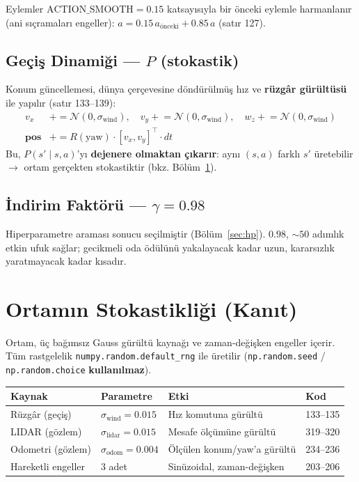 \documentclass[11pt,a4paper]{article}
\begin{document}
Eylemler $\text{ACTION\_SMOOTH}=0.15$ katsayısıyla bir önceki eylemle harmanlanır
(ani sıçramaları engeller): $a = 0.15\,a_{\text{önceki}} + 0.85\,a$ (satır 127).

\subsection{Geçiş Dinamiği --- $P$ (stokastik)}
Konum güncellemesi, dünya çerçevesine döndürülmüş hız ve \textbf{rüzgâr
gürültüsü} ile yapılır (satır 133--139):
\begin{align*}
v_x &\mathrel{+}= \mathcal{N}(0, \sigma_{\text{wind}}), \quad
v_y \mathrel{+}= \mathcal{N}(0, \sigma_{\text{wind}}), \quad
w_z \mathrel{+}= \mathcal{N}(0, \sigma_{\text{wind}}) \\
\mathbf{pos} &\mathrel{+}= R(\text{yaw}) \cdot [v_x, v_y]^\top \cdot dt
\end{align*}
Bu, $P(s'\mid s,a)$'yı \textbf{dejenere olmaktan çıkarır}: aynı $(s,a)$ farklı
$s'$ üretebilir $\rightarrow$ ortam gerçekten stokastiktir (bkz. Bölüm~\ref{sec:stokastik}).

\subsection{İndirim Faktörü --- $\gamma = 0.98$}
Hiperparametre araması sonucu seçilmiştir (Bölüm~\ref{sec:hp}). $0.98$, $\sim 50$ adımlık
etkin ufuk sağlar; gecikmeli oda ödülünü yakalayacak kadar uzun, kararsızlık
yaratmayacak kadar kısadır.

\section{Ortamın Stokastikliği (Kanıt)}\label{sec:stokastik}
Ortam, üç bağımsız Gauss gürültü kaynağı ve zaman-değişken engeller içerir. Tüm
rastgelelik \texttt{numpy.random.default\_rng} ile üretilir
(\texttt{np.random.seed} / \texttt{np.random.choice} \textbf{kullanılmaz}).

\begin{center}
\begin{tabular}{llll}
\toprule
\textbf{Kaynak} & \textbf{Parametre} & \textbf{Etki} & \textbf{Kod} \\
\midrule
Rüzgâr (geçiş) & $\sigma_{\text{wind}}=0.015$ & Hız komutuna gürültü & 133--135 \\
LIDAR (gözlem) & $\sigma_{\text{lidar}}=0.015$ & Mesafe ölçümüne gürültü & 319--320 \\
Odometri (gözlem) & $\sigma_{\text{odom}}=0.004$ & Ölçülen konum/yaw'a gürültü & 234--236 \\
Hareketli engeller & 3 adet & Sinüzoidal, zaman-değişken & 203--206 \\
\bottomrule
\end{tabular}
\end{center}
\end{document}

